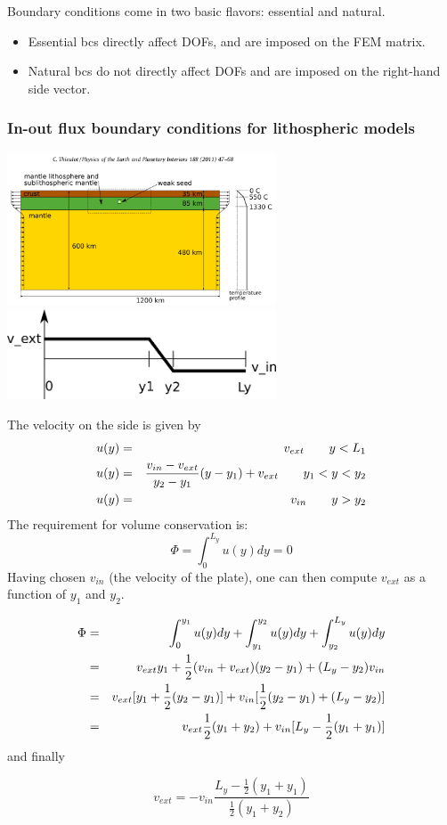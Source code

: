
Boundary conditions come in two basic flavors: essential and natural.
\begin{itemize}
\item Essential bcs directly affect DOFs, and are imposed on the FEM matrix. 
\item Natural bcs do not directly affect DOFs and are imposed on the right-hand side vector.
\end{itemize}

\subsubsection{In-out flux boundary conditions for lithospheric models}

\begin{center}
\includegraphics[width=8cm]{images/boundary_conditions/bc1}\\
\includegraphics[width=8cm]{images/boundary_conditions/drawing.png}
\end{center}

The velocity on the side is given by
\begin{eqnarray}
u(y) &=& v_{ext} \quad\quad y<L_1 \nonumber\\
u(y) &=& \frac{v_{in}-v_{ext}}{y_2-y_1}(y-y_1) + v_{ext} \quad\quad y_1<y<y_2 \nonumber\\
u(y) &=& v_{in} \quad\quad y>y_2 \nonumber
\end{eqnarray}
The requirement for volume conservation is:
\[
\Phi=\int_{0}^{L_y} u(y) dy = 0
\]
Having chosen $v_{in}$ (the velocity of the plate), one can then compute $v_{ext}$
as a function of $y_1$ and $y_2$.

\begin{eqnarray}
\Phi
&=&\int_{0}^{y_1} u(y) dy  +\int_{y_1}^{y_2} u(y) dy +\int_{y_2}^{L_y} u(y) dy \nonumber\\
&=& v_{ext} y_1  + \frac{1}{2}(v_{in}+v_{ext})(y_2-y_1) + (L_y-y_2) v_{in} \nonumber\\
&=& v_{ext} [y_1 + \frac{1}{2}(y_2-y_1) ] + v_{in} [ \frac{1}{2}(y_2-y_1)  + (L_y-y_2) ] \nonumber\\
&=& v_{ext}\frac{1}{2} (y_1 + y_2 ) + v_{in} [ L_y - \frac{1}{2}(y_1+y_1) ] \nonumber
\end{eqnarray}
and finally
\begin{mdframed}[backgroundcolor=blue!5]
\[
v_{ext} = -v_{in} \frac{ L_y - \frac{1}{2}(y_1+y_1)}{ \frac{1}{2} (y_1 + y_2 ) }
\]
\end{mdframed}
